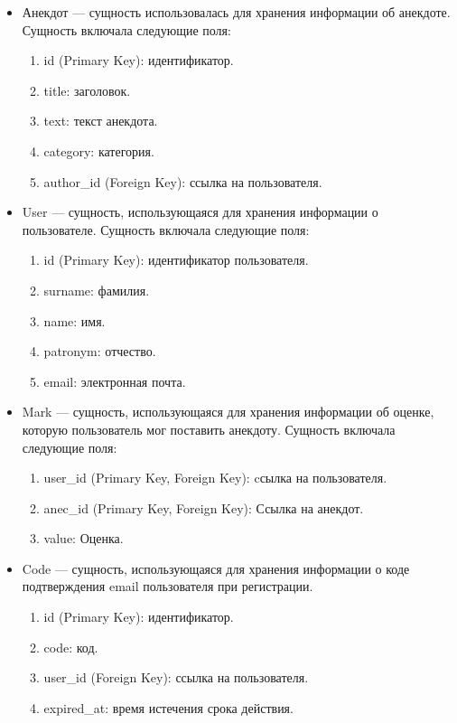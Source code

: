 \documentclass[pract]{SCWorks}
\begin{document}
\begin{itemize}
    \item Анекдот ­— сущность использовалась для хранения информации об 
    анекдоте. Сущность включала следующие поля:
    \begin{enumerate}
        \item id (Primary Key): идентификатор.
        \item title: заголовок.
        \item text: текст анекдота.
        \item category: категория.
        \item author\_id (Foreign Key): ссылка на пользователя.
    \end{enumerate}

    \item User — сущность, использующаяся для хранения информации о 
    пользователе. Сущность включала следующие поля:
    \begin{enumerate}
        \item id (Primary Key): идентификатор пользователя.
        \item surname: фамилия.
        \item name: имя.
        \item patronym: отчество.
        \item email: электронная почта.
    \end{enumerate}
        
    \item Mark — сущность, использующаяся для хранения информации об оценке,
    которую пользователь мог поставить анекдоту. Сущность включала следующие 
    поля:
    \begin{enumerate}
        \item user\_id (Primary Key, Foreign Key): cсылка на пользователя.
        \item anec\_id (Primary Key, Foreign Key): Ссылка на анекдот.
        \item value: Оценка.
    \end{enumerate}

    \item Code — сущность, использующаяся для хранения информации о коде
    подтверждения email пользователя при регистрации.
    \begin{enumerate}
        \item id (Primary Key): идентификатор.
        \item code: код.
        \item user\_id (Foreign Key): ссылка на пользователя.
        \item expired\_at: время истечения срока действия.
    \end{enumerate}
\end{itemize}
\end{document}
